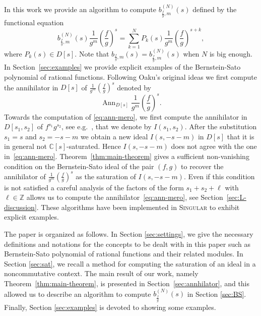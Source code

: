 \documentclass[a4paper,12pt]{amsart}
\theoremstyle{plain}
\theoremstyle{definition}
\theoremstyle{remark}
\def\CC{\mathbb{C}}
\def\ZZ{\mathbb{Z}}
\DeclareMathOperator{\Ann}{Ann}
\begin{document}
In this work we provide an algorithm to compute $b_{\frac{f}{g},m}^{(N)}(s)$
defined by the functional equation
\begin{equation}\label{eq:functional-N}
b_{\frac{f}{g},m}^{(N)}(s) \frac{1}{g^m} \left( \frac{f}{g} \right)^s =
\sum_{k = 1}^N P_k(s) \frac{1}{g^m} \left( \frac{f}{g} \right)^{s+k},
\end{equation}
where $P_k(s) \in D[s]$. Note that $b_{\frac{f}{g},m}(s) = b_{\frac{f}{g},m}^{(N)}(s)$ when $N$ is big enough.
In Section~\ref{sec:examples} we provide explicit examples of the Bernstein-Sato polynomial of rational functions.
Following Oaku's original ideas \cite{Oak97} we first compute the annihilator in $D[s]$
of $\frac{1}{g^m} \left( \frac{f}{g} \right)^s$ denoted by
\begin{equation}\label{eq:ann-mero}
\Ann_{D[s]} \frac{1}{g^m} \left( \frac{f}{g} \right)^s.
\end{equation}
Towards the computation of \eqref{eq:ann-mero}, we first compute the annihilator in $D[s_1,s_2]$ of
$f^{s_1} g^{s_2}$, see e.g.~\cite{OaTa99}, that we denote by $I(s_1,s_2)$.
After the substitution $s_1 = s$ and $s_2 = -s-m$ we obtain a new ideal  $I(s,-s-m)$ in $D[s]$ that it is in general
not $\CC[s]$-saturated. Hence $I(s,-s-m)$ does not agree with the one in~\eqref{eq:ann-mero}.
Theorem~\ref{thm:main-theorem} gives a sufficient non-vanishing condition on the Bernstein-Sato ideal of the pair $(f,g)$
to recover the annihilator of $\frac{1}{g^m} \left( \frac{f}{g} \right)^s$ as the saturation of $I(s,-s-m)$.
Even if this condition is not satisfied a careful analysis of the factors of the form $s_1+s_2+\ell$ with $\ell \in \ZZ$
allows us to compute the annihilator~\eqref{eq:ann-mero}, see Section~\ref{sec:L-discussion}.
These algorithms have been implemented in \textsc{Singular} to exhibit explicit examples.

The paper is organized as follows. In Section \ref{sec:settings}, we give the necessary definitions and notations for the concepts
to be dealt with in this paper such as Bernstein-Sato polynomial of rational functions and their related modules. In Section \ref{sec:sat},
we recall a method for computing the saturation of an ideal in a noncommutative context.
The main result of our work, namely Theorem~\ref{thm:main-theorem}, is presented in Section~\ref{sec:annhilator}, and this allowed us
to describe an algorithm to compute $b_{\frac{f}{g}}^{(N)}(s)$ in Section \ref{sec:BS}.
Finally, Section \ref{sec:examples} is devoted to showing some examples.
\end{document}
